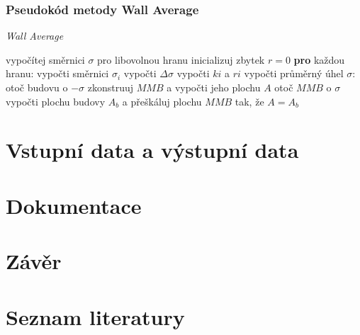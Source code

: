\documentclass[15pt]{article}
\begin{document}
\begin{spacing}{1.5}
\subsubsection*{Pseudokód metody Wall Average}
    \begin{algorithm}
        \caption {\textit{Wall Average}}
        \begin{algorithmic}[1]
            \State vypočítej směrnici $\sigma$ pro libovolnou hranu
            \State inicializuj zbytek $r = 0$
            \State \textbf{pro} každou hranu:
            \State \indent vypočti směrnici $\sigma_{i}$
            \State \indent vypočti  $\Delta\sigma$
            \State \indent vypočti $k{i}$ a $r{i}$
            \State vypočti průměrný úhel $\sigma$:
            \State otoč budovu o $ - \sigma$
            \State zkonstruuj $MMB$ a vypočti jeho plochu $A$
            \State otoč $MMB$ o $\sigma$ 
            \State vypočti plochu budovy $A_{b}$ a přeškáluj plochu $MMB$ tak, že $A = A_{b}$
        \end{algorithmic}
    \end{algorithm}


\newpage
\section*{Vstupní data a výstupní data}

\newpage
\section*{Dokumentace}

\newpage
\section*{Závěr}

\newpage
\section*{Seznam literatury}


\end{spacing}
\end{document}
